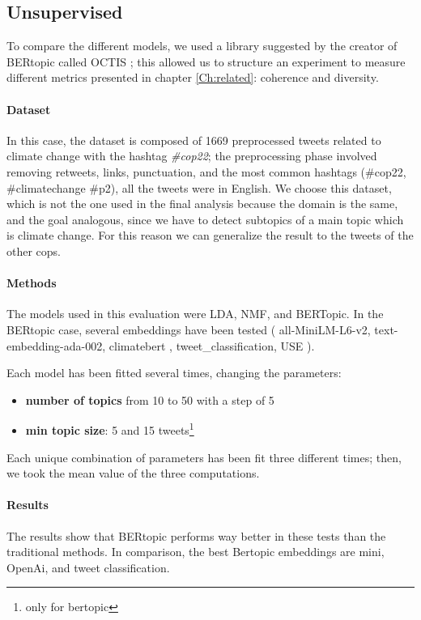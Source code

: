 \subsection{Unsupervised}
\label{sec:unsupervised}
To compare the different models, we used a library suggested by the creator of BERtopic called OCTIS \cite{DBLP:conf/clic-it/TerragniF21} \cite{terragni2020octis}; this allowed us to structure an experiment to measure different metrics presented in chapter \ref{Ch:related}: coherence and diversity.




\paragraph{Dataset}
In this case, the dataset is composed of 1669 preprocessed tweets related to climate change with the hashtag \textit{\#cop22}; the preprocessing phase involved removing retweets, links, punctuation, and the most common hashtags (\#cop22, \#climatechange \#p2), all the tweets were in English.  We choose this dataset, which is not the one used in the final analysis because the domain is the same, and the goal analogous, since we have to detect subtopics of a main topic which is climate change. For this reason we can generalize the result to the tweets of the other cops.

\paragraph{Methods}

The models used in this evaluation were LDA, NMF, and BERTopic. In the BERtopic case, several embeddings have been tested (  all-MiniLM-L6-v2, text-embedding-ada-002, climatebert \cite{webersinke_climatebert_2022}, tweet\_classification, USE \cite{cer_use_2018}).

Each model has been fitted several times, changing the parameters:
\begin{itemize}
    \item  \textbf{number of topics} from 10 to 50 with a step of 5 
    \item \textbf{min topic size}: 5 and 15  tweets\footnote{only for bertopic}
\end{itemize}


Each unique combination of parameters has been fit three different times; then, we took the mean value of the three computations.

\paragraph{Results}
The results show that BERtopic performs way better in these tests than the traditional methods. In comparison, the best Bertopic embeddings are mini, OpenAi, and tweet classification.

